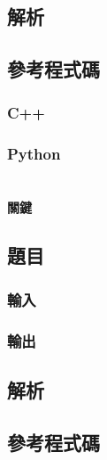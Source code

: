 \documentclass[a4paper,10pt]{article}
\begin{document}
\subsection{解析}



\subsection{參考程式碼}

\subsubsection{C++}

%

\subsubsection{Python}

%

\section{}

\paragraph{關鍵}

\subsection{題目}



\subsubsection{輸入}



\subsubsection{輸出}



\subsection{解析}



\subsection{參考程式碼}
\end{document}
